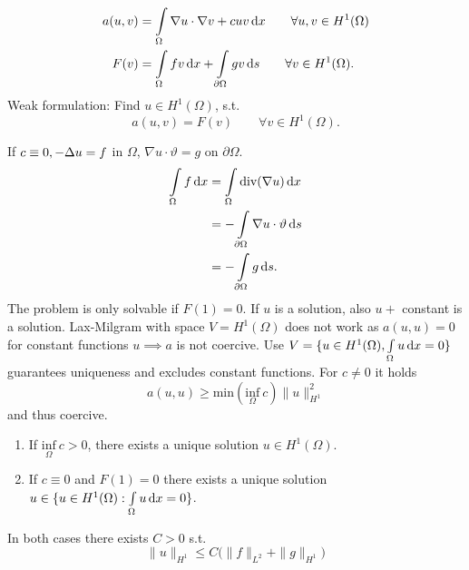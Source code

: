 \begin{enumerate}[=(\alph*)]
\begin{align*}
		a(u,v) &= \int \limits_\Omega \nabla u \cdot  \nabla v + cuv \mathop{}\!\mathrm{d} x \qquad \forall u,v\in H^1(\Omega)\\
		F(v) &= \int \limits_\Omega fv \mathop{}\!\mathrm{d} x + \int \limits_{\partial\Omega} gv \mathop{}\!\mathrm{d} s \qquad \forall v \in H^1(\Omega).
	\end{align*}
	Weak formulation: Find $u \in H^1(\Omega)$, s.t.
	\begin{equation*}
		a(u,v) = F(v) \qquad \forall v \in H^1(\Omega).
	\end{equation*}
	\begin{comment_}
		If $c \equiv 0, -\Delta u=f$ in $\Omega$, $\nabla u\cdot\vartheta = g$ on $\partial \Omega$.
		\begin{align*}
			\int \limits_\Omega f \mathop{}\!\mathrm{d} x &= \int \limits_\Omega \text{div}(\nabla u) \mathop{}\!\mathrm{d} x\\
			&= -\int \limits_{\partial \Omega} \nabla u \cdot  \vartheta \mathop{}\!\mathrm{d} s\\
			&= -\int \limits_{\partial \Omega} g \mathop{}\!\mathrm{d} s.
		\end{align*}
		The problem is only solvable if $F(1)=0$. If $u$ is a solution, also $u +$ constant is a solution.\enter
		Lax-Milgram with space $V = H^1(\Omega)$ does not work as $a(u,u)=0$ for constant functions $u \implies a$ is not coercive.\enter
		Use $V = \{ u \in H^1(\Omega), \int \limits_\Omega u \mathop{}\!\mathrm{d} x =0 \}$ guarantees uniqueness and excludes constant functions. For $c \neq 0$ it holds 
		\begin{equation*}
			a(u,u) \geq \text{min}\left( \underset{\Omega}{\text{inf}}\ c \right)\|u\|^2_{H^1} 
		\end{equation*}
		and thus coercive.
	\end{comment_}
	\begin{thrm}\enter
		\begin{enumerate}[label=(\Roman*)]
			\item If $\underset{\Omega}{\text{inf}}\ c > 0$, there exists a unique solution $u \in H^1(\Omega)$.
			\item If $c \equiv 0$ and $F(1)=0$ there exists a unique solution $u \in \{ u \in H^1(\Omega): \int \limits_\Omega u \mathop{}\!\mathrm{d} x =0 \}$.
		\end{enumerate}
		In both cases there exists $C > 0$ s.t. 
		\begin{equation*}
			\|u\|_{H^1} \leq C \big ( \|f\|_{L^2} + \|g\|_{H^1} \big )	
		\end{equation*}
	\end{thrm}
	\begin{proof_}\enter

\end{proof_}
\end{enumerate}
